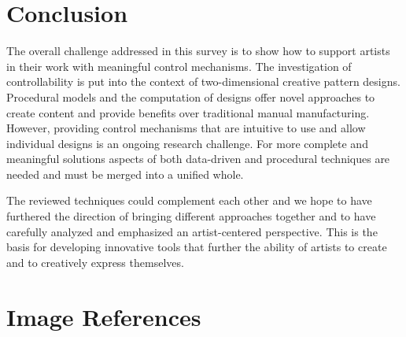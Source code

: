 

\section{Conclusion}
\label{sec:conclusion}

The overall challenge addressed in this survey is to show how to support artists in their work with meaningful control mechanisms. The investigation of controllability is put into the context of two-dimensional creative pattern designs. Procedural models and the computation of designs offer novel approaches to create content and provide benefits over traditional manual manufacturing. However, providing control mechanisms that are intuitive to use and allow individual designs is an ongoing research challenge. For more complete and meaningful solutions aspects of both data-driven and procedural techniques are needed and must be merged into a unified whole.  

The reviewed techniques could complement each other and we hope to have furthered the direction of bringing different approaches together and to have carefully analyzed and emphasized an artist-centered perspective. This is the basis for developing innovative tools that further the ability of artists to create and to creatively express themselves.


\setcounter{secnumdepth}{0} %
\section{Image References}
\label{sec:image_references}

\footnotesize
\sloppy
{}


